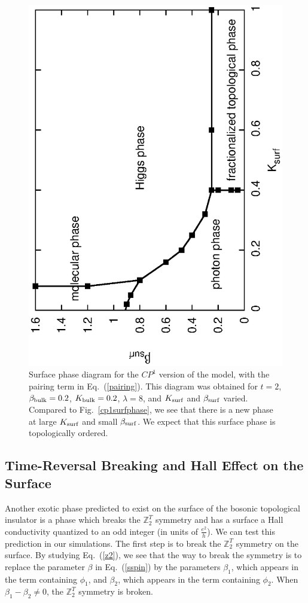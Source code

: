\documentclass[prb,twocolumn]{revtex4-1}
\def\ztwot{\mathbb{Z}_2^T}
\begin{document}
\begin{figure}
\includegraphics[angle=-90,width=0.9\linewidth]{figures/cp1surfacepairing.eps}
\caption{Surface phase diagram for the $CP^1$ version of the model, with the pairing term in Eq.~(\ref{pairing}). This diagram was obtained for $t=2$, $\beta_{\rm bulk}=0.2$, $K_{\rm bulk}=0.2$, $\lambda=8$, and $K_{\rm surf}$ and $\beta_{\rm surf}$ varied. Compared to Fig.~\ref{cp1surfphase}, we see that there is a new phase at large $K_{\rm surf}$ and small $\beta_{\rm surf}$. We expect that this surface phase is topologically ordered.  }
\label{cp1surfpair}
\end{figure}

\subsection{Time-Reversal Breaking and Hall Effect on the Surface}

Another exotic phase predicted to exist on the surface of the bosonic topological insulator is a phase which breaks the $\ztwot$ symmetry and has a surface a Hall conductivity quantized to an odd integer (in units of $\frac{e^2}{h}$).\cite{SenthilVishwanath} We can test this prediction in our simulations. The first step is to break the $\ztwot$ symmetry on the surface. By studying Eq.~(\ref{z2}), we see that the way to break the symmetry is to replace the parameter $\beta$ in Eq.~(\ref{sspin}) by the parameters $\beta_1$, which appears in the term containing $\phi_1$, and $\beta_2$, which appears in the term containing $\phi_2$. When $\beta_1-\beta_2\neq 0$, the $\ztwot$ symmetry is broken.
\end{document}
